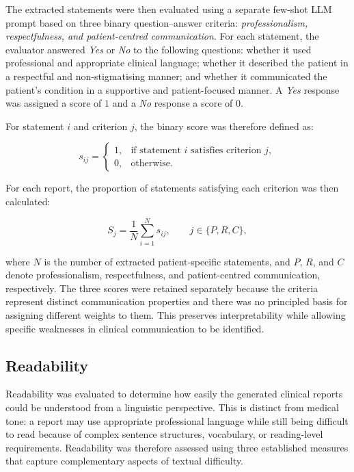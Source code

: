 \documentclass[ %
                    author={Aman Kumar Singh},
                supervisor={Dr. Edwin Simpson},
                    degree={MSc},
                     title={Quality-Aware Knowledge Distillation of Large Language Models for Efficient Personalised Clinical Report Generation},
                  subtitle={},
                      type={},
                      year={2021}]{dissertation}
\begin{document}
The extracted statements were then evaluated using a separate few-shot LLM
prompt based on three binary question--answer criteria:
\textit{professionalism, respectfulness, and patient-centred
communication}. For each statement, the evaluator answered \textit{Yes} or
\textit{No} to the following questions: whether it used professional and
appropriate clinical language; whether it described the patient in a
respectful and non-stigmatising manner; and whether it communicated the
patient's condition in a supportive and patient-focused manner. A
\textit{Yes} response was assigned a score of $1$ and a \textit{No}
response a score of $0$.

For statement $i$ and criterion $j$, the binary score was therefore defined
as:

\begin{equation}
s_{ij} =
\begin{cases}
1, & \text{if statement } i \text{ satisfies criterion } j,\\
0, & \text{otherwise}.
\end{cases}
\end{equation}

For each report, the proportion of statements satisfying each criterion was
then calculated:

\begin{equation}
S_j =
\frac{1}{N}\sum_{i=1}^{N}s_{ij},
\qquad
j\in\{P,R,C\},
\end{equation}

where $N$ is the number of extracted patient-specific statements, and
$P$, $R$, and $C$ denote professionalism, respectfulness, and
patient-centred communication, respectively. The three scores were retained
separately because the criteria represent distinct communication properties
and there was no principled basis for assigning different weights to them.
This preserves interpretability while allowing specific weaknesses in
clinical communication to be identified.
\subsection{Readability}
\label{sec:readability}

Readability was evaluated to determine how easily the generated clinical
reports could be understood from a linguistic perspective. This is distinct
from medical tone: a report may use appropriate professional language while
still being difficult to read because of complex sentence structures,
vocabulary, or reading-level requirements. Readability was therefore
assessed using three established measures that capture complementary
aspects of textual difficulty.
\end{document}
